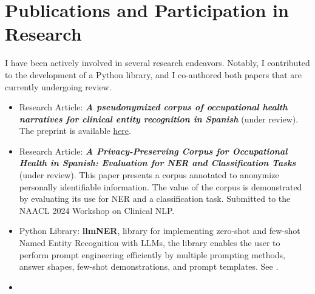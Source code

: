 \documentclass[11 pt,oneside,a4paper,titlepage]{article}
\begin{document}
{\begin{minipage}{11.3cm}
        
        

        
         
        \vspace*{0.22cm}    
       

     \section*{Publications and Participation in Research}
         \vspace*{0.5cm}  
    I have been actively involved in several research endeavors. Notably, I contributed to the development of a Python library, and I co-authored both papers that are currently undergoing review.
    \begin{itemize}

    \footnotesize
        
        \item Research Article: \textbf{\textit{A pseudonymized corpus of occupational health narratives for clinical entity recognition in Spanish}} (under review). The preprint is available \href{https://doi.org/10.21203/rs.3.rs-3826527/v1}{here}.
        \item Research Article: \textbf{\textit{A Privacy-Preserving Corpus for Occupational Health in Spanish: Evaluation for NER and Classification Tasks}} (under review). This paper presents a corpus annotated to anonymize personally identifiable information. The value of the corpus is demonstrated by evaluating its use for NER and a classification task. Submitted to the NAACL 2024 Workshop on Clinical NLP.
        \item Python Library: \textbf{llmNER}, library for implementing zero-shot and few-shot Named Entity Recognition with LLMs, the library enables the user to perform prompt engineering efficiently by multiple prompting methods, answer shapes, few-shot demonstrations, and prompt templates. See \href{https://github.com/plncmm/llmner}{}.
        \item[\vspace{\fill}]
    \end{itemize}
            
            
    \end{minipage}} %

\end{document}
